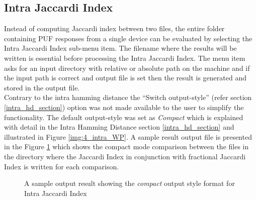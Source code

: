 \subsection{Intra Jaccardi Index}
Instead of computing Jaccardi index between two files, the entire folder containing PUF responses from a single device can be evaluated by selecting the Intra Jaccardi Index sub-menu item. The filename where the results will be written is essential before processing the Intra Jaccardi Index. The menu item asks for an input directory with relative or absolute path on the machine and if the input path is correct and output file is set then the result is generated and stored in the
output file.\\

Contrary to the intra hamming distance the ``Switch output-style'' (refer section \ref{intra_hd_section}) option was not made available to the user to simplify the functionality. The default output-style was set as \emph{Compact} which is explained with detail in the Intra Hamming Distance section \ref{intra_hd_section} and illustrated in Figure \ref{img:4_intra_WP}. A sample result output file is presented in the Figure \ref{img:intra_jaccardi_compact} which shows the compact mode comparison between the files in the
directory where the Jaccardi Index in conjunction with fractional Jaccardi Index is written for each comparison.\\
\begin{figure}
\centering
{}
\caption{A sample output result showing the \emph{compact} output style format for Intra Jaccardi Index }
\label{img:intra_jaccardi_compact}
\end{figure}

